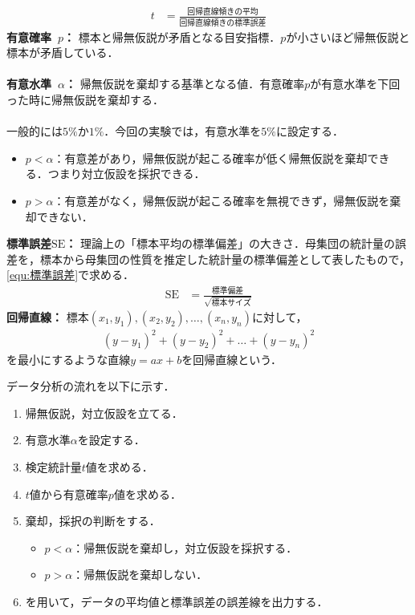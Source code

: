 \begin{oframed}
    \begin{align}
        t & = \frac{\textrm{回帰直線傾きの平均}}{\textrm{回帰直線傾きの標準誤差}}\label{equ:t値}
    \end{align}
    \textbf{有意確率\ \(p\)：} 標本と帰無仮説が矛盾となる目安指標．\(p\)が小さいほど帰無仮説と標本が矛盾している．\\ \\
    \textbf{有意水準\ \(\alpha\)：} 帰無仮説を棄却する基準となる値．有意確率\(p\)が有意水準を下回った時に帰無仮説を棄却する．\\ \\
    一般的には\(5\%\)か\(1\%\)．今回の実験では，有意水準を\(5\%\)に設定する．
    \begin{itemize}
        \item \(p<\alpha\)：有意差があり，帰無仮説が起こる確率が低く帰無仮説を棄却できる．つまり対立仮設を採択できる．
        \item \(p>\alpha\)：有意差がなく，帰無仮説が起こる確率を無視できず，帰無仮説を棄却できない．
    \end{itemize}
    \textbf{標準誤差\(\textrm{SE}\)：} 理論上の「標本平均の標準偏差」の大きさ．母集団の統計量の誤差を，標本から母集団の性質を推定した統計量の標準偏差として表したもので，\eqref{equ:標準誤差}で求める．
    \begin{align}
        \textrm{SE} & =\frac{\textrm{標準偏差}}{\sqrt{標本サイズ}}\label{equ:標準誤差}
    \end{align}
    \textbf{回帰直線：} 標本\((x_1,y_1),(x_2,y_2),\dots ,(x_n,y_n)\)に対して，
    \begin{align*}
        (y-y_1)^2+(y-y_2)^2+\dots +(y-y_n)^2
    \end{align*}
    を最小にするような直線\(y=ax+b\)を回帰直線という．\\
    \hfill\cite[p.168, p.187, p.200\ -\ p.205]{Pythonで学ぶあたらしい統計学の教科書}
\end{oframed}
データ分析の流れを以下に示す．
\begin{multicols}{2}
    \begin{enumerate}
        \item 帰無仮説，対立仮設を立てる．
        \item 有意水準\(\alpha\)を設定する．
        \item 検定統計量\(t\)値を求める．
        \item \(t\)値から有意確率\(p\)値を求める．
        \item 棄却，採択の判断をする．
              \begin{itemize}
                  \item \(p<\alpha\)：帰無仮説を棄却し，対立仮設を採択する．
                  \item \(p>\alpha\)：帰無仮説を棄却しない．
              \end{itemize}
        \item \matlab を用いて，データの平均値と標準誤差の誤差線を出力する．
    \end{enumerate}
\end{multicols}
